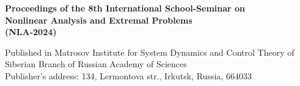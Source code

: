 \documentclass[12pt,final]{llncs}
\begin{document}
\newpage
\thispagestyle{empty}
 \begin{englisharticle}
\begin{center}
${}$
\vfill




{\bf  Proceedings of the 8th International School-Seminar on\\[0.3em]
 Nonlinear Analysis and Extremal Problems\\[0.3em]  (NLA-2024)}

\vfill\vfill



Published in Matrosov Institute for System Dynamics and Control Theory
of\\ Siberian Branch of Russian Academy of Sciences\\[0.5em]

Publisher's address: 134, Lermontova str., Irkutsk, Russia, 664033

\end{center}

 \end{englisharticle}

\iffalse
\clearpage
\addtocmark[2]{Author Index} %
\renewcommand{\indexname}{Author Index}
\clearpage
\addtocmark[2]{Subject Index} %
\markboth{Subject Index}{Subject Index}
\renewcommand{\indexname}{Subject Index}
%
\fi
\end{document}
